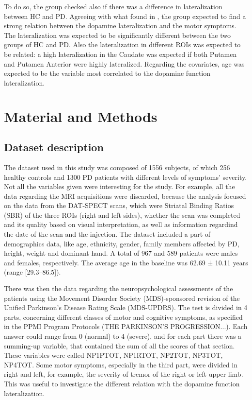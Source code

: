 \documentclass[]{article}
\begin{document}
\begin{multicols}{2}
To do so, the group checked also if there was a difference in lateralization between HC and PD. 
\newline
Agreeing with what found in \cite{pirker_correlation_2003}, the group expected to find a strong relation between the dopamine lateralization and the motor symptoms. The lateralization was expected to be significantly different between the two groups of HC and PD. Also the lateralization in different ROIs was expected to be related: a high lateralization in the Caudate was expected if both Putamen and Putamen Anterior were highly lateralized. Regarding the covariates, age was expected to be the variable most correlated to the dopamine function lateralization.

\section{Material and Methods}

\subsection{Dataset description}
The dataset used in this study was composed of 1556 subjects, of which 256 healthy controls and 1300 PD patients with different levels of symptoms' severity. Not all the variables given were interesting for the study. For example, all the data regarding the MRI acquisitions were discarded, because the analysis focused on the data from the DAT-SPECT scans, which were Striatal Binding Ratios (SBR) of the three ROIs (right and left sides), whether the scan was completed and its quality based on visual interpretation, as well as information regardind the date of the scan and the injection. 
\newline
The dataset included a part of demographics data, like age, ethnicity, gender, family members affected by PD, height, weight and dominant hand.
A total of 967 and 589 patients were males and females, respectively. The average age in the baseline was 62.69 ± 10.11 years (range [29.3–86.5]). 

There was then the data regarding the neuropsychological assessments of the patients using the Movement Disorder Society (MDS)-sponsored revision of the Unified Parkinson's Disease Rating Scale (MDS-UPDRS). The test is divided in 4 parts, concerning different classes of motor and cognitive symptoms, as specified in the PPMI Program Protocols (THE PARKINSON'S PROGRESSION...). Each answer could range from 0 (normal) to 4 (severe), and for each part there was a summing-up variable, that contained the sum of all the scores of that section. These variables were called NP1PTOT, NP1RTOT, NP2TOT, NP3TOT, NP4TOT. Some motor symptoms, especially in the third part, were divided in right and left, for example, the severity of tremor of the right or left upper limb. This was useful to investigate the different relation with the dopamine function lateralization.
\newline


\end{multicols}
\end{document}
